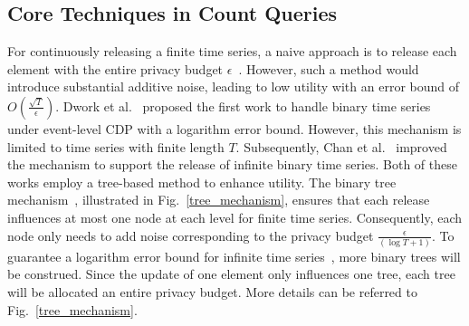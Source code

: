 \subsection{Core Techniques in Count Queries}
For continuously releasing a finite time series, a naive approach is to release each element with the entire privacy budget $\epsilon$~\cite{chan2011private}. However, such a method would introduce substantial additive noise, leading to low utility with an error bound of $O(\frac{\sqrt{T}}{\epsilon})$. 
Dwork et al.~\cite{dwork2010differential} proposed the first work to handle binary time series under event-level CDP with a logarithm error bound. However, this mechanism is limited to time series with finite length $T$. Subsequently, Chan et al.~\cite{chan2011private} improved the mechanism to support the release of infinite binary time series. Both of these works employ a tree-based method to enhance utility. The binary tree mechanism~\cite{chan2011private}, illustrated in Fig.~\ref{tree_mechanism}, ensures that each release influences at most one node at each level for finite time series. Consequently, each node only needs to add noise corresponding to the privacy budget $\frac{\epsilon}{(\log T+1)}$. To guarantee a logarithm error bound for infinite time series~\cite{chan2011private, dong2023continual}, more binary trees will be construed. Since the update of one element only influences one tree, each tree will be allocated an entire privacy budget. More details can be referred to Fig.~\ref{tree_mechanism}.

